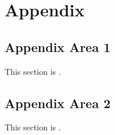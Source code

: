 
\chapter{Appendix}
\label{loc:AppendixA}
% 


\section{Appendix Area 1}
\label{loc:Appendix_1}
% 

This section is \TBD.

\section{Appendix Area 2}
\label{loc:Appendix_2}
% 

This section is \TBD.
